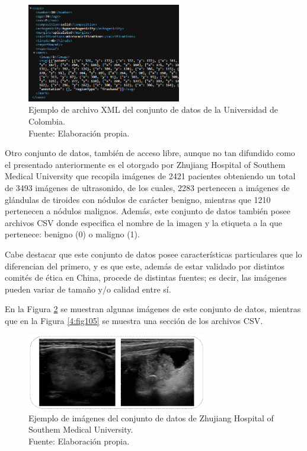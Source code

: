 \begin{figure}[H]
	\begin{center}
		\includegraphics[width=0.60\textwidth]{4/figures/xmlfile.png}
		\caption[Ejemplo de archivo XML del conjunto de datos de la Universidad de Colombia]{Ejemplo de archivo XML del conjunto de datos de la Universidad de Colombia. \\
		Fuente: Elaboración propia.}
		\label{4:fig103}
	\end{center}
\end{figure}

Otro conjunto de datos, también de acceso libre, aunque no tan difundido como el presentado anteriormente es el otorgado por Zhujiang Hospital of Southem Medical University que recopila imágenes de 2421 pacientes obteniendo un total de 3493 imágenes de ultrasonido, de los cuales, 2283 pertenecen a imágenes de glándulas de tiroides con nódulos de carácter benigno, mientras que 1210 pertenecen a nódulos malignos. Además, este conjunto de datos también posee archivos CSV donde especifica el nombre de la imagen y la etiqueta a la que pertenece: benigno (0) o maligno (1).

Cabe destacar que este conjunto de datos posee características particulares que lo diferencian del primero, y es que este, además de estar validado por distintos comités de ética en China, procede de distintas fuentes; es decir, las imágenes pueden variar de tamaño y/o calidad entre sí.

En la Figura \ref{4:fig104} se muestran algunas imágenes de este conjunto de datos, mientras que en la Figura \ref{4:fig105} se muestra una sección de los archivos CSV.

\begin{figure}[H]
	\begin{center}
		\includegraphics[width=0.70\textwidth]{4/figures/tn3k_examp.png}
		\caption[Ejemplo de imágenes del conjunto de datos de Zhujiang Hospital of Southem Medical University]{Ejemplo de imágenes del conjunto de datos de Zhujiang Hospital of Southem Medical University. \\
		Fuente: Elaboración propia.}
		\label{4:fig104}
	\end{center}
\end{figure}

